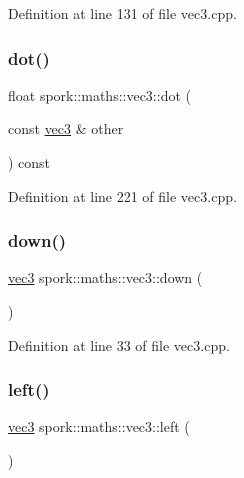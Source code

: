 Definition at line 131 of file vec3.\+cpp.

\mbox{\label{structspork_1_1maths_1_1vec3_a2261ddda8375f01b33a0abd532c0c915}} 
\subsubsection{\texorpdfstring{dot()}{dot()}}
{\footnotesize\ttfamily float spork\+::maths\+::vec3\+::dot (\begin{DoxyParamCaption}\item[{const \hyperlink{structspork_1_1maths_1_1vec3}{vec3} \&}]{other }\end{DoxyParamCaption}) const}



Definition at line 221 of file vec3.\+cpp.

\mbox{\label{structspork_1_1maths_1_1vec3_a7be169be3105cfc288112f35655e9dea}} 
\subsubsection{\texorpdfstring{down()}{down()}}
{\footnotesize\ttfamily \hyperlink{structspork_1_1maths_1_1vec3}{vec3} spork\+::maths\+::vec3\+::down (\begin{DoxyParamCaption}{ }\end{DoxyParamCaption})\hspace{0.3cm}{\ttfamily [static]}}



Definition at line 33 of file vec3.\+cpp.

\mbox{\label{structspork_1_1maths_1_1vec3_a7aa9b70355b9a0d4a30372c0d2e4b05a}} 
\subsubsection{\texorpdfstring{left()}{left()}}
{\footnotesize\ttfamily \hyperlink{structspork_1_1maths_1_1vec3}{vec3} spork\+::maths\+::vec3\+::left (\begin{DoxyParamCaption}{ }\end{DoxyParamCaption})\hspace{0.3cm}{\ttfamily [static]}}



